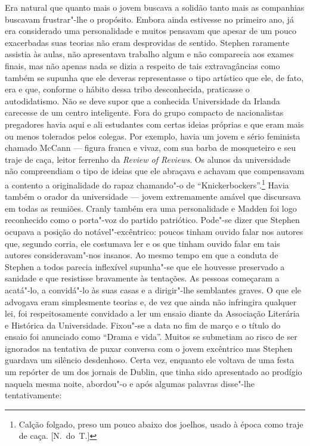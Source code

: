 Era natural que quanto mais o jovem buscava a solidão tanto mais as
companhias buscavam frustrar"-lhe o propósito.  Embora ainda estivesse
no primeiro ano, já era considerado uma personalidade e muitos pensavam
que apesar de um pouco exacerbadas suas teorias não eram desprovidas de
sentido.  Stephen raramente assistia às aulas, não apresentava trabalho
algum e não comparecia aos exames finais, mas não apenas nada se dizia a
respeito de tais extravagâncias como também se supunha que ele deveras
representasse o tipo artístico que ele, de fato, era e que, conforme o
hábito dessa tribo desconhecida, praticasse o autodidatismo.  Não se
deve supor que a conhecida Universidade da Irlanda carecesse de um
centro inteligente.  Fora do grupo compacto de nacionalistas
\label{pregadores"-havia} pregadores havia aqui e ali estudantes com certas ideias próprias e
que eram mais ou menos tolerados pelos colegas.  Por exemplo, havia um
jovem e sério feminista chamado McCann --- figura franca e vivaz, com
sua barba de mosqueteiro e seu traje de caça, leitor ferrenho da
\textit{Review of Reviews}.  Os alunos da universidade não compreendiam
o tipo de ideias que ele abraçava e achavam que compensavam a contento
a originalidade do rapaz chamando"-o de “Knickerbockers”.\footnote{
Calção folgado, preso um pouco abaixo dos joelhos, usado à época como
traje de caça. [N.~do~T.]}  Havia também o orador da universidade ---
jovem extremamente amável que discursava em todas as reuniões.  Cranly
também era uma personalidade e Madden foi logo reconhecido como o
\label{porta"-voz} porta"-voz do partido patriótico.  Pode"-se dizer que Stephen ocupava a
posição do notável"-excêntrico: poucos tinham ouvido falar nos autores
que, segundo corria, ele costumava ler e os que tinham ouvido falar em
tais autores consideravam"-nos insanos.  Ao mesmo tempo em que a conduta
de Stephen a todos parecia inflexível supunha"-se que ele houvesse
preservado a sanidade e que resistisse bravamente às tentações.  As
pessoas começaram a acatá"-lo, a convidá"-lo às suas casas e a
dirigir"-lhe semblantes graves.  O que ele advogava eram simplesmente	
teorias e, de vez que ainda não infringira qualquer lei, foi
respeitosamente convidado a ler um ensaio diante da Associação
Literária e Histórica da Universidade.  Fixou"-se a data no fim de março
e o título do ensaio foi anunciado como “Drama e vida”.  Muitos se
submetiam ao risco de ser ignorados na tentativa de puxar conversa com
o jovem excêntrico mas Stephen guardava um silêncio desdenhoso.  Certa
vez, enquanto ele voltava de uma festa um repórter de um dos jornais de
Dublin, que tinha sido apresentado ao prodígio naquela mesma noite,
abordou"-o e após algumas palavras disse"-lhe tentativamente:

